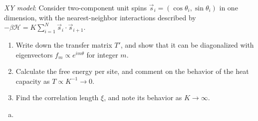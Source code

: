 \begin{problem}
    \textit{XY model}: Consider two-component unit spins $\vec{s}_i = (\cos\theta_i, \sin\theta_i)$ in one dimension, with the nearest-neighbor interactions described by $-\beta\mathcal{H} = K\sum_{i=1}^N\vec{s}_i\cdot\vec{s}_{i+1}$.

    \begin{enumerate}
        \item[(a)] Write down the transfer matrix $T'$, and show that it can be diagonalized with eigenvectors $f_m \propto e^{im\theta}$ for integer $m$.

        \item[(b)] Calculate the free energy per site, and comment on the behavior of the heat capacity as $T \propto K^{-1} \to 0$.

        \item[(c)] Find the correlation length $\xi$, and note its behavior as $K \to \infty$.
    \end{enumerate}
\end{problem}

\begin{solution}
    \begin{enumerate}[(a)]
        \item
    \end{enumerate}
\end{solution}

